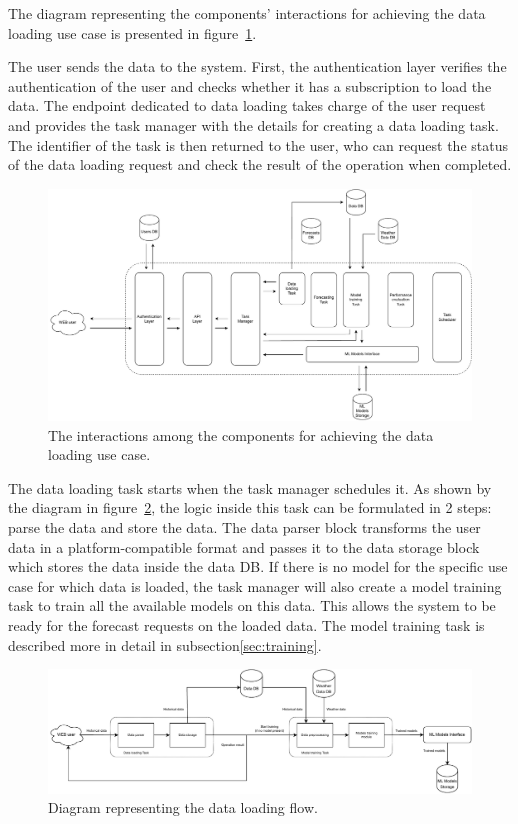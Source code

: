 The diagram representing the components' interactions for achieving the data loading use case is presented in figure~\ref{fig:loadinginteractions}.

The user sends the data to the system.
First, the authentication layer verifies the authentication of the user and checks whether it has a subscription to load the data.
The endpoint dedicated to data loading takes charge of the user request and provides the task manager with the details for creating a data loading task.
The identifier of the task is then returned to the user, who can request the status of the data loading request and check the result of the operation when completed.

\begin{figure}[H]
\centering
\includegraphics[width=1\textwidth]{images/architecture_data_loading_interactions}
\caption{The interactions among the components for achieving the data loading use case.}
\label{fig:loadinginteractions}
\end{figure}

The data loading task starts when the task manager schedules it.
As shown by the diagram in figure~\ref{fig:loadingflow}, the logic inside this task can be formulated in 2 steps: parse the data and store the data.
The data parser block transforms the user data in a platform-compatible format and passes it to the data storage block which stores the data inside the data DB.
If there is no model for the specific use case for which data is loaded, the task manager will also create a model training task to train all the available models on this data.
This allows the system to be ready for the forecast requests on the loaded data.
The model training task is described more in detail in subsection\ref{sec:training}.

\begin{figure}[H]
\centering
\includegraphics[width=1\textwidth]{images/architecture_data_loading_flow}
\caption{Diagram representing the data loading flow.}
\label{fig:loadingflow}
\end{figure}

